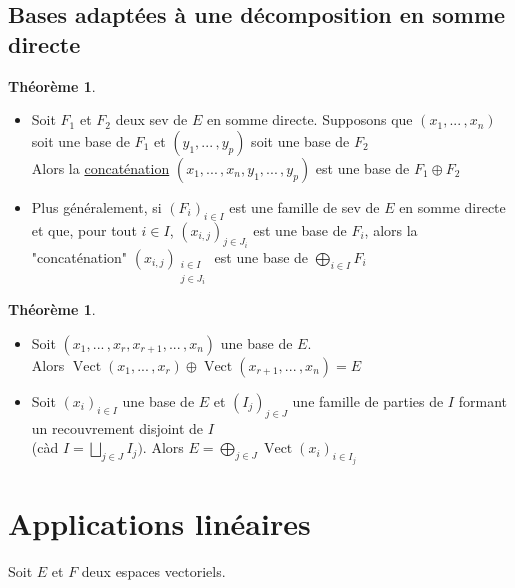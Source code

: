 \documentclass[10pt,a4paper]{article}
\theoremstyle{definition}
\newtheorem{theorem}[proposition]{Théorème}
\DeclareMathOperator{\vect}{Vect}
\begin{document}
\subsection{Bases adaptées à une décomposition en somme directe}
\begin{theorem}
\hfill
\begin{itemize}
\item Soit $F_1$ et $F_2$ deux sev de $E$ en somme directe. Supposons que $(x_1, ...\, , x_n)$ soit une base de $F_1$ et $(y_1, ...\, , y_p)$ soit une base de $F_2$ \\
Alors la \uline{concaténation} $(x_1, ...\, , x_n, y_1, ...\, ,y_p)$ est une base de $F_1 \oplus F_2$
\item Plus généralement, si $(F_i)_{i \in I}$ est une famille de sev de $E$ en somme directe et que, pour tout $i \in I$, $(x_{i, j})_{j \in J_i}$ est une base de $F_i$, alors la "concaténation" $(x_{i, j})_{\substack{i \in I \\ j \in J_i}}$ est une base de $\bigoplus\limits_{i \in I} F_i$ 
\end{itemize}
\end{theorem}

\pagebreak

\begin{theorem}
\hfill
\begin{itemize}
\item Soit $(x_1, ...\, , x_r, x_{r + 1}, ...\, , x_n)$ une base de $E$. \\
Alors $\vect(x_1, ...\, , x_r) \oplus \vect(x_{r + 1}, ...\, , x_n) = E$
\item Soit $(x_i)_{i \in I}$ une base de $E$ et $(I_j)_{j \in J}$ une famille de parties de $I$ formant un recouvrement disjoint de $I$ \\
(càd $I = \bigsqcup\limits_{j \in J} I_j)$. Alors $E = \bigoplus\limits_{j \in J} \vect(x_i)_{i \in I_j}$
\end{itemize}
\end{theorem}

\section{Applications linéaires}
Soit $E$ et $F$ deux espaces vectoriels.
\end{document}
